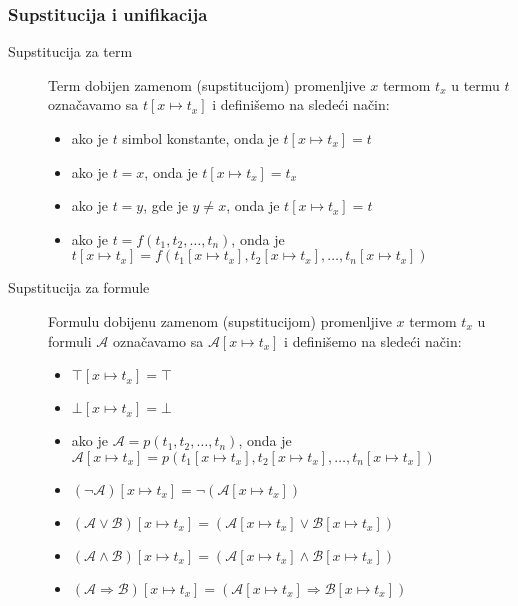 \documentclass[../main.tex]{subfiles}
\begin{document}
\subsubsection{Supstitucija i unifikacija}
\begin{description}

\item[Supstitucija za term] \hfill

Term dobijen zamenom (supstitucijom) promenljive $x$ termom $t_x$ u termu $t$ označavamo sa  $t[x\mapsto t_x]$ i definišemo na sledeći način:
\begin{itemize}
\item ako je $t$ simbol konstante, onda je $t[x\mapsto t_x]=t$
\item ako je $t=x$, onda je $t[x\mapsto t_x]=t_x$
\item ako je $t=y$, gde je $y\neq x$, onda je $t[x\mapsto t_x]=t$
\item ako je $t=f(t_1, t_2, \ldots, t_n)$, onda je $t[x\mapsto t_x]=f(t_1[x\mapsto t_x], t_2[x\mapsto t_x], \ldots, t_n[x\mapsto t_x])$
\end{itemize}

\item[Supstitucija za formule] \hfill

Formulu dobijenu zamenom (supstitucijom) promenljive $x$ termom $t_x$ u formuli $\mathcal{A}$ označavamo sa $\mathcal{A}[x\mapsto t_x]$ i definišemo na sledeći način:
\begin{itemize}
\item $\top[x\mapsto t_x]=\top$

\item $\bot[x\mapsto t_x]=\bot$

\item ako je $\mathcal{A}=p(t_1, t_2, \ldots, t_n)$, onda je $\mathcal{A}[x\mapsto t_x]=p(t_1[x\mapsto t_x], t_2[x\mapsto t_x], \ldots, t_n[x\mapsto t_x])$

\item $(\neg \mathcal{A})[x\mapsto t_x]=\neg(\mathcal{A}[x\mapsto t_x])$

\item $(\mathcal{A}\vee \mathcal{B}  )[x\mapsto t_x]=(\mathcal{A}[x\mapsto t_x] \vee  \mathcal{B}[x\mapsto t_x] )$

\item $(\mathcal{A} \wedge \mathcal{B})[x\mapsto t_x]=(\mathcal{A}  [x\mapsto t_x] \wedge  \mathcal{B}[x\mapsto t_x] )$

\item $(\mathcal{A} \Rightarrow  \mathcal{B})[x\mapsto t_x]=(\mathcal{A}  [x\mapsto t_x] \Rightarrow \mathcal{B}[x\mapsto t_x] )$


\end{itemize}
\end{description}
\end{document}
